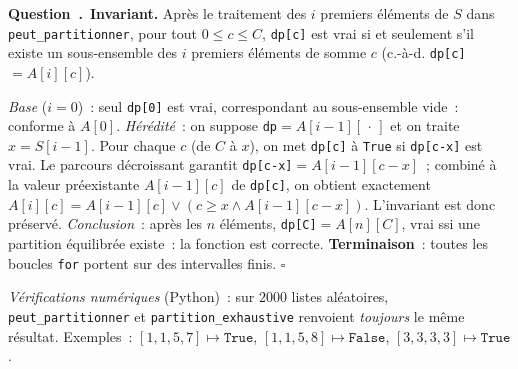\documentclass[11pt,a4paper]{article}
\newcounter{qcnt}
\newcommand{\Q}{\medskip\par\stepcounter{qcnt}\noindent\textbf{Question~\theqcnt.}~}
\newcommand{\code}[1]{\lstinline!#1!}
\begin{document}
\Q \textbf{Invariant.} Après le traitement des $i$ premiers éléments de $S$ dans
\code{peut_partitionner}, pour tout $0\le c\le C$, \code{dp[c]} est vrai si et seulement s'il
existe un sous-ensemble des $i$ premiers éléments de somme $c$ (c.-à-d. \code{dp[c]}$=A[i][c]$).

\noindent\emph{Base} ($i=0$)~: seul \code{dp[0]} est vrai, correspondant au sous-ensemble vide~:
conforme à $A[0]$. \emph{Hérédité}~: on suppose \code{dp}$=A[i-1][\,\cdot\,]$ et on traite
$x=S[i-1]$. Pour chaque $c$ (de $C$ à $x$), on met \code{dp[c]} à \code{True} si \code{dp[c-x]}
est vrai. Le parcours décroissant garantit \code{dp[c-x]}$=A[i-1][c-x]$~; combiné à la valeur
préexistante $A[i-1][c]$ de \code{dp[c]}, on obtient exactement $A[i][c]=A[i-1][c]\lor(c\ge x\land
A[i-1][c-x])$. L'invariant est donc préservé. \emph{Conclusion}~: après les $n$ éléments,
\code{dp[C]}$=A[n][C]$, vrai ssi une partition équilibrée existe~: la fonction est correcte.
\textbf{Terminaison}~: toutes les boucles \code{for} portent sur des intervalles finis. $\square$

\medskip
\noindent\emph{Vérifications numériques} (Python)~: sur $2000$ listes aléatoires,
\code{peut_partitionner} et \code{partition_exhaustive} renvoient \emph{toujours} le même résultat.
Exemples~: $[1,1,5,7]\mapsto\mathtt{True}$, $[1,1,5,8]\mapsto\mathtt{False}$,
$[3,3,3,3]\mapsto\mathtt{True}$.
\end{document}
